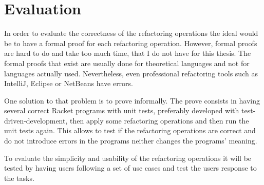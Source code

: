 
% 
% 

\section{Evaluation}


In order to evaluate the correctness of the refactoring operations the ideal would be to have a formal proof for each refactoring operation.
However, formal proofs are hard to do and take too much time, that I do not have for this thesis.
The formal proofs that exist are usually done for theoretical languages and not for languages actually used.
Nevertheless, even professional refactoring tools such as IntelliJ, Eclipse or NetBeans have errors. \cite{verbaere2006jungl} 

One solution to that problem is to prove informally. 
The prove consists in having several correct Racket programs with unit tests, preferably developed with test-driven-development, then apply some refactoring operations and then run the unit tests again. 
This allows to test if the refactoring operations are correct and do not introduce errors in the programs neither changes the programs' meaning.

To evaluate the simplicity and usability of the refactoring operations it will be tested by having users following a set of use cases and test the users response to the tasks.